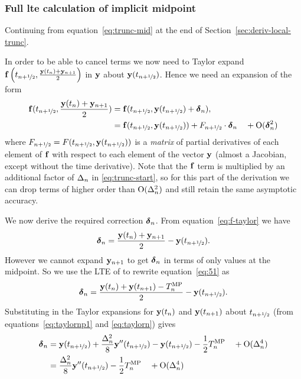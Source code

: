 \subsubsection{Full lte calculation of implicit midpoint}
\label{sec:full-imr-lte-calculation}

Continuing from equation~\eqref{eq:trunc-mid} at the end of Section~\ref{sec:deriv-local-trunc}.

In order to be able to cancel terms we now need to Taylor expand ${\mathbf{f}}\left( t_{n+\nicefrac{1}{2}}, \frac{\mathbf{y}(t_n) + \mathbf{y}_{n+1}}{2} \right)$ in $\mathbf{y}$ about $\mathbf{y}(t_{n+\nicefrac{1}{2}})$.
Hence we need an expansion of the form
\begin{align}
  \fv(\thf, \frac{\yv(t_n) + \yv_{n+1}}{2}) &= \fv(\thf, \yvhf + \dyn),
  \notag \\
  &= \fv(\thf, \yvhf) + \dfdyhf \cdot \dyn  \porder{\dyn^2}
  \label{eq:f-taylor}
\end{align}
where $F_{n+\nicefrac{1}{2}} = F(t_{n+\nicefrac{1}{2}}, \mathbf{y}(t_{n+\nicefrac{1}{2}}))$ is a \emph{matrix} of partial derivatives of each element of ${\mathbf{f}}$ with respect to each element of the vector $\mathbf{y}$ (\ie almost a Jacobian, except without the time derivative).
Note that the ${\mathbf{f}}$ term is multiplied by an additional factor of $\Delta_{n}$ in \eqref{eq:trunc-start}, so for this part of the derivation we can drop terms of higher order than $\text{O}(\Delta_{n}^2)$ and still retain the same asymptotic accuracy.

We now derive the required correction $\mbox{\boldmath$\delta$}_{n}$.
From equation~\eqref{eq:f-taylor} we have
\begin{equation}
  \dyn = \frac{\yv(t_n) + \yv_{n+1}}{2} - \yvhf.
  \label{eq:51}
\end{equation}
However we cannot expand $\mathbf{y}_{n+1}$ to get $\mbox{\boldmath$\delta$}_{n}$ in terms of only values at the midpoint.
So we use the LTE of \imr to rewrite equation~\eqref{eq:51} as
\begin{equation}
  \mbox{\boldmath$\delta$}_{n} = \frac{\mathbf{y}(t_n) + \mathbf{y}(t_{n+1}) - T_n^{\text{MP}}}{2} - \mathbf{y}(t_{n+\nicefrac{1}{2}}).
\end{equation}
Substituting in the Taylor expansions for $\mathbf{y}(t_n)$ and $\mathbf{y}(t_{n+1})$ about $t_{n+\nicefrac{1}{2}}$ (from equations~\eqref{eq:taylornp1} and \eqref{eq:taylorn}) gives
\begin{align}
  \dyn &= \yvhf + \frac{\dtn^2}{8} \yvhf[''] - \yvhf - \frac{1}{2} \lte^\IMP \porder{\dtn^4} \notag\\
  &= \frac{\dtn^2}{8} \yvhf[''] - \frac{1}{2} \lte^\IMP \porder{\dtn^4}
  \label{eq:dy-value}
\end{align}



